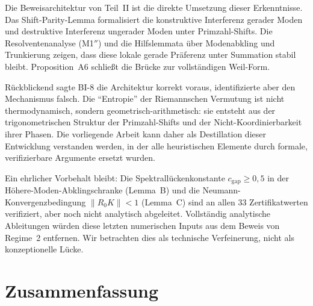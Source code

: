 \documentclass[12pt,a4paper]{article}
\theoremstyle{definition}
\theoremstyle{remark}
\begin{document}
Die Beweisarchitektur von Teil~II ist die direkte Umsetzung dieser Erkenntnisse. Das Shift-Parity-Lemma formalisiert die konstruktive Interferenz gerader Moden und destruktive Interferenz ungerader Moden unter Primzahl-Shifts. Die Resolventenanalyse (M1$''$) und die Hilfslemmata über Modenabkling und Trunkierung zeigen, dass diese lokale gerade Präferenz unter Summation stabil bleibt. Proposition~A6 schließt die Brücke zur vollständigen Weil-Form.

Rückblickend sagte BI-8 die Architektur korrekt voraus, identifizierte aber den Mechanismus falsch. Die ``Entropie'' der Riemannschen Vermutung ist nicht thermodynamisch, sondern geometrisch-arithmetisch: sie entsteht aus der trigonometrischen Struktur der Primzahl-Shifts und der Nicht-Koordinierbarkeit ihrer Phasen. Die vorliegende Arbeit kann daher als Destillation dieser Entwicklung verstanden werden, in der alle heuristischen Elemente durch formale, verifizierbare Argumente ersetzt wurden.

Ein ehrlicher Vorbehalt bleibt: Die Spektrallückenkonstante $c_{\mathrm{gap}} \geq 0{,}5$ in der Höhere-Moden-Abklingschranke (Lemma~B) und die Neumann-Konvergenzbedingung $\|R_0 K\| < 1$ (Lemma~C) sind an allen $33$ Zertifikatwerten verifiziert, aber noch nicht analytisch abgeleitet. Vollständig analytische Ableitungen würden diese letzten numerischen Inputs aus dem Beweis von Regime~2 entfernen. Wir betrachten dies als technische Verfeinerung, nicht als konzeptionelle Lücke.


\section{Zusammenfassung}
\label{sec:summary}
\end{document}
